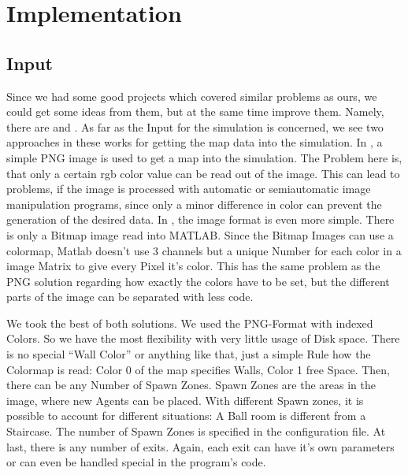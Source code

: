 \documentclass[11pt]{article}
\begin{document}
\section{Implementation}

\subsection{Input}
Since we had some good projects which covered similar problems as ours, we could get some ideas from them, but at the same time improve them.
Namely, there are \cite{multilevel} and \cite{airplane}. As far as the Input for the simulation is concerned, we see two approaches in these works for getting the map data into the simulation. In \cite{multilevel}, a simple PNG image is used to get a map into the simulation. The Problem here is, that only a certain rgb color value can be read out of the image.
This can lead to problems, if the image is processed with automatic or semiautomatic image manipulation programs, since only a minor difference in color can prevent the generation of the desired data.
In \cite{airplane}, the image format is even more simple. There is only a Bitmap image read into MATLAB. Since the Bitmap Images can use a colormap, Matlab doesn't use 3 channels but a unique Number for each color in a image Matrix to give every Pixel it's color.
This has the same problem as the PNG solution regarding how exactly the colors have to be set, but
the different parts of the image can be separated with less code.

We took the best of both solutions. We used the PNG-Format with indexed Colors.
So we have the most flexibility with very little usage of Disk space.
There is no special ``Wall Color'' or anything like that, just a simple Rule how the Colormap is read:
Color 0 of the map specifies Walls, Color 1 free Space. Then, there can be any Number of Spawn Zones.
Spawn Zones are the areas in the image, where new Agents can be placed. With different Spawn zones, it is possible to account for different situations: A Ball room is different from a Staircase. The number of Spawn Zones is specified in the configuration file. At last, there is any number of exits. Again, each exit can have it's own parameters or can even be handled special in the program's code. 
\end{document}
